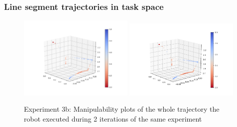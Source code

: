 \begin{frame}
\frametitle{Line segment trajectories in task space}
\begin{center}
\begin{figure}[!htb]
\centering
\includegraphics[width=0.49\textwidth]{../images/robot_planner3/robot_planner3b_manip1.png}
\includegraphics[width=0.49\textwidth]{../images/robot_planner3/robot_planner3b_manip2.png}
\caption{Experiment 3b: Manipulability plots of the whole trajectory the robot executed during 2 iterations of the same experiment}
\label{robot-planner3b-line-seg-manipulability-plots}
\end{figure}
\end{center}
\end{frame}

